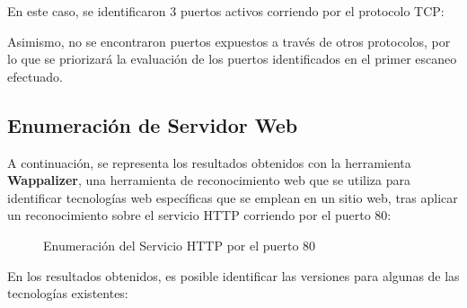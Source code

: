 \documentclass[a4paper]{article} %
\begin{document}
        \vspace{0.5cm}

        En este caso, se identificaron 3 puertos activos corriendo por el protocolo TCP:

        \vspace{0.5cm}

        \centering

        \vspace{0.5cm}

        \justifying %

        Asimismo, no se encontraron puertos expuestos a través de otros protocolos, por lo que se priorizará la evaluación de los puertos identificados en el primer escaneo efectuado.

        \clearpage
        \subsection{Enumeración de Servidor Web}
	
	A continuación, se representa los resultados obtenidos con la herramienta \textbf{Wappalizer}, una herramienta de reconocimiento web que se utiliza para identificar tecnologías web específicas que se emplean en un sitio web, tras aplicar un reconocimiento sobre el servicio HTTP corriendo por el puerto 80:

	\begin{figure}[h]
                \centering
                \setlength{\fboxrule}{0.8pt}
                \caption{Enumeración del Servicio HTTP por el puerto 80}
        \end{figure}

        En los resultados obtenidos, es posible identificar las versiones para algunas de las tecnologías existentes:
\end{document}
